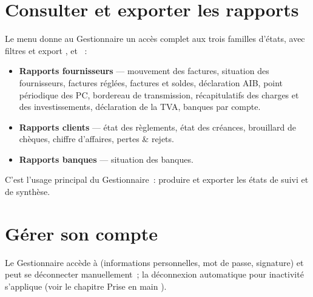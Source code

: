 
\section{Consulter et exporter les rapports}

Le menu  donne au Gestionnaire un accès complet aux trois familles d'états, avec filtres et export ,  et ~:

\begin{itemize}
  \item \textbf{Rapports fournisseurs} — mouvement des factures, situation des fournisseurs, factures réglées, factures et soldes, déclaration AIB, point périodique des PC, bordereau de transmission, récapitulatifs des charges et des investissements, déclaration de la TVA, banques par compte.
  \item \textbf{Rapports clients} — état des règlements, état des créances, brouillard de chèques, chiffre d'affaires, pertes \& rejets.
  \item \textbf{Rapports banques} — situation des banques.
\end{itemize}

C'est l'usage principal du Gestionnaire~: produire et exporter les états de suivi et de synthèse.


\section{Gérer son compte}

Le Gestionnaire accède à  (informations personnelles, mot de passe, signature) et peut se déconnecter manuellement~; la déconnexion automatique pour inactivité s'applique (voir le chapitre \og Prise en main \fg{}).

